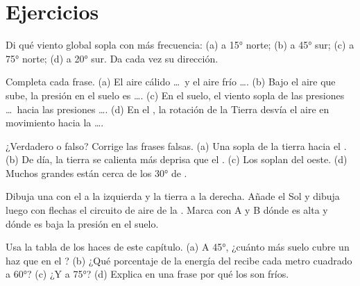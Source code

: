 \section{Ejercicios}

\begin{exercise}[$\star$]\label{exo:g8:winds-global-circulation:1}
Di qué viento global sopla con más frecuencia: (a) a \ang{15} norte;
(b) a \ang{45} sur; (c) a \ang{75} norte; (d) a \ang{20} sur. Da cada vez
su dirección.
\end{exercise}

\begin{exercise}[$\star$]\label{exo:g8:winds-global-circulation:2}
Completa cada frase. (a) El aire cálido \dots\ y el aire frío \dots.
(b) Bajo el aire que sube, la presión en el suelo es \dots. (c) En el
suelo, el viento sopla de las presiones \dots\ hacia las presiones \dots.
(d) En el , la rotación de la Tierra desvía el aire en
movimiento hacia la \dots.
\end{exercise}

\begin{exercise}[$\star$]\label{exo:g8:winds-global-circulation:3}
¿Verdadero o falso? Corrige las frases falsas. (a) Una  sopla
de la tierra hacia el . (b) De día, la tierra se calienta más deprisa
que el . (c) Los  soplan del oeste. (d) Muchos grandes 
están cerca de los \ang{30} de .
\end{exercise}

\begin{exercise}[$\star$]\label{exo:g8:winds-global-circulation:4}
Dibuja una  con el  a la izquierda y la tierra a la derecha. Añade
el Sol y dibuja luego con flechas el circuito de aire de la .
Marca con A y B dónde es alta y dónde es baja la presión en el suelo.
\end{exercise}

\begin{exercise}[$\star\star$]\label{exo:g8:winds-global-circulation:5}
Usa la tabla de los haces de este capítulo. (a) A \ang{45}, ¿cuánto más
suelo cubre un haz que en el ? (b) ¿Qué porcentaje de la energía
del  recibe cada metro cuadrado a \ang{60}? (c) ¿Y a \ang{75}?
(d) Explica en una frase por qué los  son fríos.
\end{exercise}

